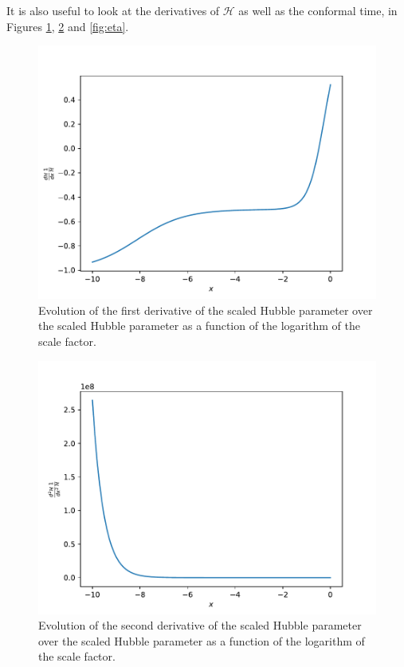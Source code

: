 \documentclass{aa}
\begin{document}
It is also useful to look at the derivatives of $\mathcal H$ as well as the conformal time, in Figures \ref{fig:dhpdx}, \ref{fig:ddhpddx} and \ref{fig:eta}.
\begin{figure}[ht]
\centering
\includegraphics[width=\hsize]{figures/dHpdx_over_Hp.pdf}
  \caption{Evolution of the first derivative of the scaled Hubble parameter over the scaled Hubble parameter as a function of the logarithm of the scale factor.}
     \label{fig:dhpdx}
\end{figure}

\begin{figure}[ht]
\centering
\includegraphics[width=\hsize]{figures/ddHpddx_over_Hp.pdf}
  \caption{Evolution of the second derivative of the scaled Hubble parameter over the scaled Hubble parameter as a function of the logarithm of the scale factor.}
     \label{fig:ddhpddx}
\end{figure}
\end{document}
